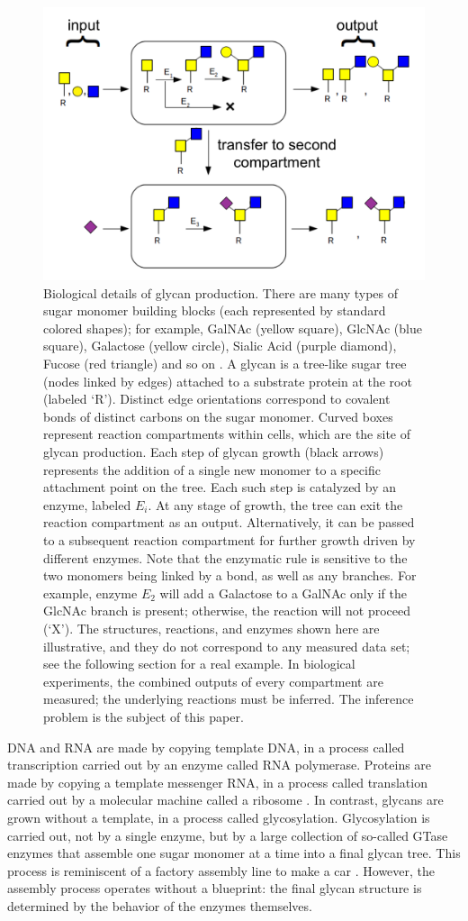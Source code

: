 \begin{figure}[ht!]
\centering
\includegraphics[width=0.8\linewidth]{gfig1.png}
\caption{Biological details of glycan production. There are many types of sugar monomer building blocks (each represented by standard colored shapes); for example, GalNAc (yellow square), GlcNAc (blue square), Galactose (yellow circle), Sialic Acid (purple diamond), Fucose (red triangle) and so on \cite{Varki2017}. A glycan is a tree-like sugar tree (nodes linked by edges) attached to a substrate protein at the root (labeled `R'). Distinct edge orientations correspond to covalent bonds of distinct carbons on the sugar monomer. Curved boxes represent reaction compartments within cells, which are the site of glycan production. Each step of glycan growth (black arrows) represents the addition of a single new monomer to a specific attachment point on the tree. Each such step is catalyzed by an enzyme, labeled $E_i$. At any stage of growth, the tree can exit the reaction compartment as an output. Alternatively, it can be passed to a subsequent reaction compartment for further growth driven by different enzymes. Note that the enzymatic rule is sensitive to the two monomers being linked by a bond, as well as any branches. For example, enzyme $E_2$ will add a Galactose to a GalNAc only if the GlcNAc branch is present; otherwise, the reaction will not proceed (`X'). The structures, reactions, and enzymes shown here are illustrative, and they do not correspond to any measured data set; see the following section for a real example. In biological experiments, the combined outputs of every compartment are measured; the underlying reactions must be inferred. The inference problem is the subject of this paper.}
\end{figure}

DNA and RNA are made by copying template DNA, in a process called transcription carried out by an enzyme called RNA polymerase. Proteins are made by copying a template messenger RNA, in a process called translation carried out by a molecular machine called a ribosome \cite{alberts2013essential}. In contrast, glycans are grown without a template, in a process called glycosylation. Glycosylation is carried out, not by a single enzyme, but by a large collection of so-called GTase enzymes that assemble one sugar monomer at a time into a final glycan tree. This process is reminiscent of a factory assembly line to make a car \cite{Jaiman2018}. However, the assembly process operates without a blueprint: the final glycan structure is determined by the behavior of the enzymes themselves.

